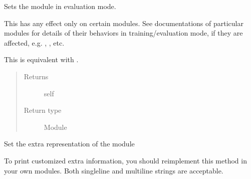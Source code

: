 \documentclass[letterpaper,10pt,english]{sphinxmanual}
\begin{document}
\begin{fulllineitems}
\begin{fulllineitems}
\label{\detokenize{api/dynamics:geology.metamodelling.dynamics.NeuralDifferentialEquation.dump_patches}}
\end{fulllineitems}


\begin{fulllineitems}
\label{\detokenize{api/dynamics:geology.metamodelling.dynamics.NeuralDifferentialEquation.eval}}
Sets the module in evaluation mode.

This has any effect only on certain modules. See documentations of
particular modules for details of their behaviors in training/evaluation
mode, if they are affected, e.g. , ,
etc.

This is equivalent with .
\begin{quote}\begin{description}
\item[{Returns}] \leavevmode
self

\item[{Return type}] \leavevmode
Module

\end{description}\end{quote}

\end{fulllineitems}


\begin{fulllineitems}
\label{\detokenize{api/dynamics:geology.metamodelling.dynamics.NeuralDifferentialEquation.extra_repr}}
Set the extra representation of the module

To print customized extra information, you should reimplement
this method in your own modules. Both single\sphinxhyphen{}line and multi\sphinxhyphen{}line
strings are acceptable.

\end{fulllineitems}


\end{fulllineitems}
\end{document}
